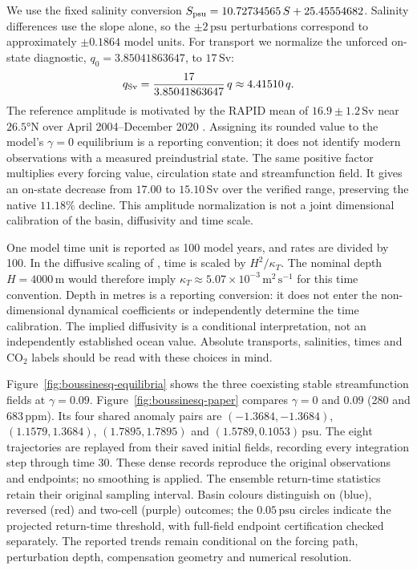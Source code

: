 \documentclass[12pt, a4paper]{article}
\newcommand{\Sv}{\,\text{Sv}}    %
\newcommand{\psu}{\,\text{psu}}
\newcommand{\CO}{CO\ensuremath{_2}}
\begin{document}
We use the fixed salinity conversion $S_{\rm psu}=10.72734565\,S+25.45554682$. Salinity differences use the slope alone, so the $\pm2\psu{}$ perturbations correspond to approximately $\pm0.1864$ model units. For transport we normalize the unforced on-state diagnostic, $q_0=3.85041863647$, to $17\Sv{}$:
\begin{equation}
  q_{\rm Sv}=\frac{17}{3.85041863647}\,q\approx4.41510\,q.
\end{equation}
The reference amplitude is motivated by the RAPID mean of $16.9\pm1.2\Sv{}$ near $26.5°\text{N}$ over April 2004--December 2020 \citep{Johns2023AMOCHeatTransport}. Assigning its rounded value to the model's $\gamma=0$ equilibrium is a reporting convention; it does not identify modern observations with a measured preindustrial state. The same positive factor multiplies every forcing value, circulation state and streamfunction field. It gives an on-state decrease from $17.00$ to $15.10\Sv{}$ over the verified range, preserving the native $11.18\%$ decline. This amplitude normalization is not a joint dimensional calibration of the basin, diffusivity and time scale.

One model time unit is reported as 100 model years, and rates are divided by 100. In the diffusive scaling of \citet{Soons2025MostLikelyNoiseinduced}, time is scaled by $H^2/\kappa_T$. The nominal depth $H=4000\,\mathrm{m}$ would therefore imply $\kappa_T\approx5.07\times10^{-3}\,\mathrm{m}^2\,\mathrm{s}^{-1}$ for this time convention. Depth in metres is a reporting conversion: it does not enter the non-dimensional dynamical coefficients or independently determine the time calibration. The implied diffusivity is a conditional interpretation, not an independently established ocean value. Absolute transports, salinities, times and \CO{} labels should be read with these choices in mind.

Figure~\ref{fig:boussinesq-equilibria} shows the three coexisting stable streamfunction fields at $\gamma=0.09$. Figure~\ref{fig:boussinesq-paper} compares $\gamma=0$ and $0.09$ (280 and $683\,\text{ppm}$). Its four shared anomaly pairs are $(-1.3684,-1.3684)$, $(1.1579,1.3684)$, $(1.7895,1.7895)$ and $(1.5789,0.1053)\psu{}$. The eight trajectories are replayed from their saved initial fields, recording every integration step through time 30. These dense records reproduce the original observations and endpoints; no smoothing is applied. The ensemble return-time statistics retain their original sampling interval. Basin colours distinguish on (blue), reversed (red) and two-cell (purple) outcomes; the $0.05\psu{}$ circles indicate the projected return-time threshold, with full-field endpoint certification checked separately. The reported trends remain conditional on the forcing path, perturbation depth, compensation geometry and numerical resolution.
\end{document}
